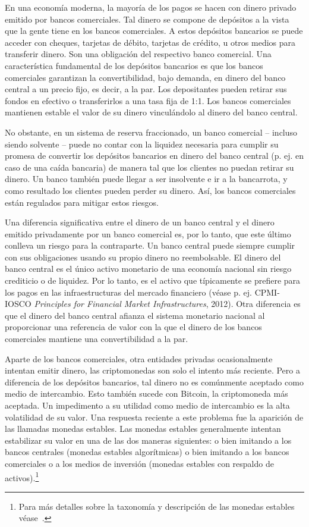 \documentclass[a4paper,10pt]{article} %
\begin{document}
En una economía moderna, la mayoría de los pagos se hacen con dinero
privado emitido por bancos comerciales. Tal dinero se compone de
depósitos a la vista que la gente tiene en los bancos comerciales. A
estos depósitos bancarios se puede acceder con cheques, tarjetas de
débito, tarjetas de crédito, u otros medios para transferir dinero. Son
una obligación del respectivo banco comercial. Una característica
fundamental de los depósitos bancarios es que los bancos comerciales
garantizan la convertibilidad, bajo demanda, en dinero del banco central
a un precio fijo, es decir, a la par. Los depositantes pueden retirar
sus fondos en efectivo o transferirlos a una tasa fija de 1:1. Los
bancos comerciales mantienen estable el valor de su dinero vinculándolo
al dinero del banco central.

No obstante, en un sistema de reserva fraccionado, un banco comercial
-- incluso siendo solvente -- puede no contar con la liquidez necesaria
para cumplir su promesa de convertir los depósitos bancarios en dinero
del banco central (p. ej. en caso de una caída bancaria) de manera tal
que los clientes no puedan retirar su dinero. Un banco también puede
llegar a ser insolvente e ir a la bancarrota, y como resultado los
clientes pueden perder su dinero. Así, los bancos comerciales están
regulados para mitigar estos riesgos.

Una diferencia significativa entre el dinero de un banco central y el
dinero emitido privadamente por un banco comercial es, por lo tanto, que
este último conlleva un riesgo para la contraparte. Un banco central
puede siempre cumplir con sus obligaciones usando su propio dinero no
reembolsable. El dinero del banco central es el único activo monetario
de una economía nacional sin riesgo crediticio o de liquidez. Por lo
tanto, es el activo que típicamente se prefiere para los pagos en las
infraestructuras del mercado financiero (véase p. ej. CPMI-IOSCO
\emph{Principles for Financial Market Infrastructures}, 2012). Otra
diferencia es que el dinero del banco central afianza el sistema
monetario nacional al proporcionar una referencia de valor con la que el
dinero de los bancos comerciales mantiene una convertibilidad a la par.

Aparte de los bancos comerciales, otra entidades privadas ocasionalmente
intentan emitir dinero, las criptomonedas son solo el intento más
reciente. Pero a diferencia de los depósitos bancarios, tal dinero no es
comúnmente aceptado como medio de intercambio. Esto también sucede con
Bitcoin, la criptomoneda más aceptada. Un impedimento a su utilidad como
medio de intercambio es la alta volatilidad de su valor. Una respuesta
reciente a este problema fue la aparición de las llamadas monedas
estables. Las monedas estables generalmente intentan estabilizar su
valor en una de las dos maneras siguientes: o bien imitando a los bancos
centrales (monedas estables algorítmicas) o bien imitando a los bancos
comerciales o a los medios de inversión (monedas estables con respaldo
de activos).\footnote{Para más detalles sobre la taxonomía y descripción
de las monedas estables véase~\citet{Bullmann}.}
\end{document}
